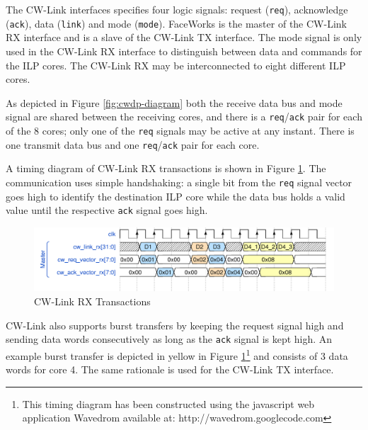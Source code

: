 \documentclass[defaultstyle,10pt,master,Helvetica]{thesis}
\begin{document}
The CW-Link interfaces specifies four logic signals: request ({\tt req}), acknowledge (\texttt{ack}), data (\texttt{link}) and mode (\texttt{mode}). FaceWorks is the master of the CW-Link RX interface and is a slave of the CW-Link TX interface. The mode signal is only used in the CW-Link RX interface to distinguish between data and commands for the \ac{ILP} cores. The CW-Link RX may be interconnected to eight different \ac{ILP} cores. 

As depicted in Figure \ref{fig:cwdp-diagram} both the receive data bus and mode signal are shared between the receiving cores, and there is a \texttt{req}/\texttt{ack} pair for each of the 8 cores; only one of the  \texttt{req} signals may be active at any instant. There is one transmit data bus and one \texttt{req}/\texttt{ack} pair for each core.

A timing diagram of CW-Link RX transactions is shown in Figure \ref{fig:tim-cw}. The communication uses simple handshaking: a single bit from the \texttt{req} signal vector goes high to identify the destination \ac{ILP} core while the data bus holds a valid value until the respective \texttt{ack} signal goes high.

\begin{figure}[h]
  \centering
      \includegraphics[scale=0.8,center]{images/fw-time.pdf}
  \caption{CW-Link RX Transactions}\label{fig:tim-cw}
\end{figure}

CW-Link also supports burst transfers by keeping the request signal high and sending data words
consecutively as long as the \texttt{ack} signal is kept high. An example burst transfer is depicted in yellow in Figure \ref{fig:tim-cw}\footnote{This timing diagram has been constructed using the javascript web application Wavedrom available at: http://wavedrom.googlecode.com} and consists of 3 data words for core 4.
The same rationale is used for the CW-Link TX interface.



\cleardoublepage

\end{document}

